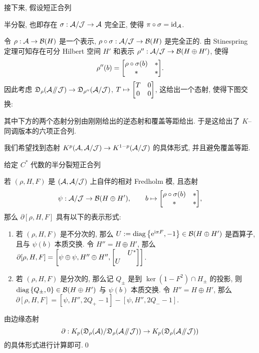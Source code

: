 接下来, 假设短正合列
\begin{center}
\end{center}
半分裂, 也即存在 $ \sigma : \mathcal{A}/\mathcal{J}\to\mathcal{A} $ 完全正, 使得 $ \pi\circ\sigma=\mathrm{id}_{\mathcal{A}} $.

令 $ \rho : \mathcal{A}\to\mathcal{B}(H) $ 是一个表示, $ \rho\circ\sigma : \mathcal{A}/\mathcal{J}\to\mathcal{B}(H) $ 是完全正的. 由 Stinespring 定理可知存在可分 Hilbert 空间 $ H' $ 和表示 $ \rho'' : \mathcal{A}/\mathcal{J}\to\mathcal{B}(H\oplus H') $, 使得
\[
	\rho''(b)=\mqty[\rho\circ\sigma(b) & * \\ * & *].
\]
因此考虑 $ \mathfrak{D}_{\rho}(\mathcal{A}\mathbin{\!/\mkern-5mu/\!}\mathcal{J})\to \mathfrak{D}_{\rho''}(\mathcal{A}/\mathcal{J}) $, $ T\mapsto\mqty[T & 0 \\ 0 & 0] $, 这给出一个态射, 使得下图交换:
\begin{center}
\end{center}
其中下方的两个态射分别由刚刚给出的逆态射和覆盖等距给出. 于是这给出了 $ K $--同调版本的六项正合列.

我们希望找到态射 $ K^p(\mathcal{A},\mathcal{A}/\mathcal{J})\to K^{1-p}(\mathcal{A}/\mathcal{J}) $ 的具体形式, 并且避免覆盖等距.

\begin{Proposition}
	给定 $ C^* $ 代数的半分裂短正合列
	\begin{center}
	\end{center}
	若 $ (\rho, H, F) $ 是 $ (\mathcal{A},\mathcal{A}/\mathcal{J}) $ 上自伴的相对 Fredholm 模, 且态射
	\[
		\psi : \CA/\CJ\to\CB(H\oplus H'),\qquad b\mapsto\mqty[\rho\circ\sigma(b) & * \\ * & *],
	\]
	那么 $ \partial[\rho, H, F] $ 具有以下的表示形式:
	\begin{enumerate}
		\item 若 $ (\rho, H, F) $ 是不分次的, 那么 $ U:=\operatorname{diag}\left\{ \mathrm{e}^{\mathrm{i}\pi F}, -1 \right\}\in\mathcal{B}(H\oplus H') $ 是酉算子, 且与 $ \psi(b) $ 本质交换. 令 $ H''=H\oplus H' $, 那么 $ \partial[\rho, H, F]=\left[\psi\oplus\psi, H''\oplus H'', \mqty[ & U^* \\ U &]\right] $.
		\item 若 $ (\rho, H, F) $ 是分次的, 那么记 $ Q_{\pm} $ 是到 $ \ker(1-F^2)\cap H_{\pm} $ 的投影, 则 $ \operatorname{diag}\left\{ Q_{\pm}, 0 \right\}\in\mathcal{B}(H\oplus H') $ 与 $ \psi(b) $ 本质交换. 令 $ H''=H\oplus H' $, 那么 $ \partial[\rho, H, F]=[\psi, H'', 2Q_+-1]-[\psi, H'', 2Q_--1] $.
	\end{enumerate}
\end{Proposition}
\begin{Proof}
	由边缘态射
	\[
		\partial : K_p(\mathfrak{D}_{\rho}(\mathcal{A})/\mathfrak{D}_{\rho}(\mathcal{A}\mathbin{\!/\mkern-5mu/\!}\mathcal{J}))\to K_p(\mathfrak{D}_{\rho}(\mathcal{A}\mathbin{\!/\mkern-5mu/\!}\mathcal{J}))
	\]
	的具体形式进行计算即可.\qed
\end{Proof}

